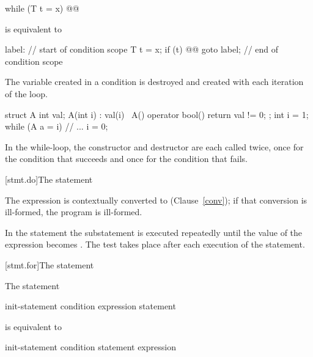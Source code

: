 \begin{codeblock}
while (T t = x) @@
\end{codeblock}

is equivalent to

\begin{codeblock}
label:
{                   // start of condition scope
  T t = x;
  if (t) {
    @@
    goto label;
  }
}                   // end of condition scope
\end{codeblock}

The variable created in a condition is destroyed and created with each
iteration of the loop.
\begin{example}

\begin{codeblock}
struct A {
  int val;
  A(int i) : val(i) { }
  ~A() { }
  operator bool() { return val != 0; }
};
int i = 1;
while (A a = i) {
  // ...
  i = 0;
}
\end{codeblock}

In the while-loop, the constructor and destructor are each called twice,
once for the condition that succeeds and once for the condition that
fails.
\end{example}

[stmt.do]{The  statement}%

\pnum
The expression is contextually converted to  (Clause~\ref{conv});
if that conversion is ill-formed, the program is ill-formed.

\pnum
In the  statement the substatement is executed repeatedly
until the value of the expression becomes . The test takes
place after each execution of the statement.

[stmt.for]{The  statement}%

\pnum
The  statement

\begin{ncbnf}
 init-statement condition\opt{} \terminal{;} expression\opt{} \terminal{)} statement
\end{ncbnf}

is equivalent to

\begin{ncbnftab}
\terminal{\{}\br
\>init-statement\br
\> condition \terminal{) \{}\br
\>\>statement\br
\>\>expression \terminal{;}\br
\>\terminal{\}}\br
\terminal{\}}
\end{ncbnftab}

